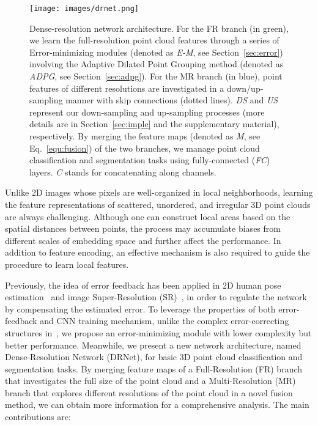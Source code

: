 \documentclass[10pt,twocolumn,letterpaper]{article}
\begin{document}
\begin{figure*}
\begin{center}
\texttt{[image: images/drnet.png]}
\end{center}
\caption{Dense-resolution network architecture. For the FR branch (in green), we learn the full-resolution point cloud features through a series of Error-minimizing modules (denoted as \emph{E-M}, see Section~\ref{sec:error}) involving the Adaptive Dilated Point Grouping method (denoted as \emph{ADPG}, see Section~\ref{sec:adpg}). For the MR branch (in blue), point features of different resolutions are investigated in a down/up-sampling manner with skip connections (dotted lines). \emph{DS} and \emph{US} represent our down-sampling and up-sampling processes (more details are in Section~\ref{sec:imple} and the supplementary material), respectively. By merging the feature maps (denoted as \emph{M}, see Eq.~\ref{equ:fusion}) of the two branches, we manage point cloud classification and segmentation tasks using fully-connected (\emph{FC}) layers. \emph{C} stands for concatenating along channels.}
\label{fig:net}
\end{figure*}
Unlike 2D images whose pixels are well-organized in local neighborhoods, learning the feature representations of scattered, unordered, and irregular 3D point clouds are always challenging. Although one can construct local areas based on the spatial distances between points, the process may accumulate biases from different scales of embedding space and further affect the performance. In addition to feature encoding, an effective mechanism is also required to guide the procedure to learn local features. 

Previously, the idea of error feedback has been applied in 2D human pose estimation~\cite{carreira2016human} and image Super-Resolution (SR)~\cite{haris2018deep, liu2019hierarchical}, in order to regulate the network by compensating the estimated error. To leverage the properties of both error-feedback and CNN training mechanism, unlike the complex error-correcting structures in~\cite{Li_2019_ICCV, qiu2019geometric}, we propose an error-minimizing module with lower complexity but better performance. Meanwhile, we present a new network architecture, named Dense-Resolution Network (DRNet), for basic 3D point cloud classification and segmentation tasks. By merging feature maps of a Full-Resolution (FR) branch that investigates the full size of the point cloud and a Multi-Resolution (MR) branch that explores different resolutions of the point cloud in a novel fusion method, we can obtain more information for a comprehensive analysis. The main contributions are:
\end{document}
